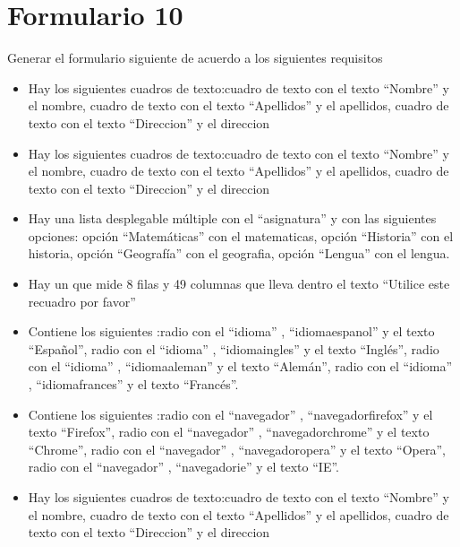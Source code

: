 \documentclass[letterpaper,10pt,spanish]{sphinxmanual}
\begin{document}
\section{Formulario 10}
\label{ejercicios/formularios/anexo_formularios:formulario-10}
Generar el formulario siguiente de acuerdo a los siguientes requisitos
\begin{itemize}
\item {} 
Hay los siguientes cuadros de texto:cuadro de texto con el texto ``Nombre'' y el  nombre, cuadro de texto con el texto ``Apellidos'' y el  apellidos, cuadro de texto con el texto ``Direccion'' y el  direccion

\item {} 
Hay los siguientes cuadros de texto:cuadro de texto con el texto ``Nombre'' y el  nombre, cuadro de texto con el texto ``Apellidos'' y el  apellidos, cuadro de texto con el texto ``Direccion'' y el  direccion

\item {} 
Hay una lista desplegable múltiple con el  ``asignatura'' y con las siguientes opciones: opción ``Matemáticas'' con el  matematicas, opción ``Historia'' con el  historia, opción ``Geografía'' con el  geografia, opción ``Lengua'' con el  lengua.

\item {} 
Hay un  que mide 8 filas y 49 columnas que lleva dentro el texto ``Utilice este recuadro por favor''

\item {} 
Contiene los siguientes :radio con el   ``idioma'' ,   ``idiomaespanol''  y el texto ``Español'', radio con el   ``idioma'' ,   ``idiomaingles''  y el texto ``Inglés'', radio con el   ``idioma'' ,   ``idiomaaleman''  y el texto ``Alemán'', radio con el   ``idioma'' ,   ``idiomafrances''  y el texto ``Francés''.

\item {} 
Contiene los siguientes :radio con el   ``navegador'' ,   ``navegadorfirefox''  y el texto ``Firefox'', radio con el   ``navegador'' ,   ``navegadorchrome''  y el texto ``Chrome'', radio con el   ``navegador'' ,   ``navegadoropera''  y el texto ``Opera'', radio con el   ``navegador'' ,   ``navegadorie''  y el texto ``IE''.

\item {} 
Hay los siguientes cuadros de texto:cuadro de texto con el texto ``Nombre'' y el  nombre, cuadro de texto con el texto ``Apellidos'' y el  apellidos, cuadro de texto con el texto ``Direccion'' y el  direccion

\end{itemize}
\end{document}
